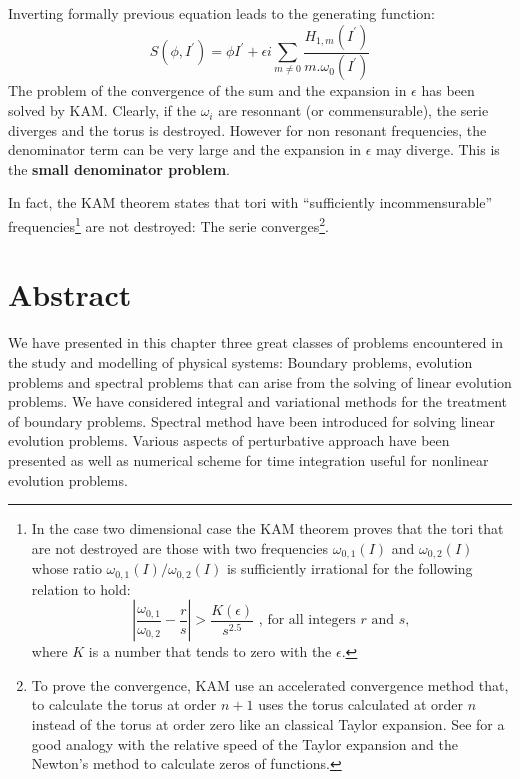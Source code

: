 \documentclass[12pt]{book}
\begin{document}
Inverting formally previous equation leads to the generating function:
\begin{equation}
S(\phi,I^\prime)=\phi I^\prime+\epsilon i \sum_{m\neq
0}\frac{H_{1,m}(I^\prime)}{m.\omega_0(I^\prime)} 
\end{equation}
The problem of the convergence of the sum and the expansion in
$\epsilon$ has been solved by KAM.
Clearly, if the $\omega_i$ are resonnant (or commensurable), the serie
diverges and the torus is destroyed. 
However for non resonant frequencies, the denominator term can be very
large and the expansion in $\epsilon$ may diverge.
This is the {\bf small denominator
problem}. 

In fact, the KAM theorem states that tori with ``sufficiently
incommensurable'' frequencies\footnote{%
In the case two dimensional
case  the KAM
theorem proves that the tori that are not destroyed are those with two
frequencies $\omega_{0,1}(I)$ 
and  $\omega_{0,2}(I)$ whose ratio $\omega_{0,1}(I)/\omega_{0,2}(I)$
is sufficiently irrational for the following relation to hold:
\begin{equation}
\left|\frac{\omega_{0,1}}{\omega_{0,2}}-\frac{r}{s}\right|>
\frac{K(\epsilon)}{s^{2.5}}\mbox{ , for all integers } r\mbox{ and } s,
\end{equation}
where $K$ is a number that tends to zero with the $\epsilon$.

} 
are not destroyed: The serie converges\footnote{%
To prove the convergence, KAM use an accelerated convergence method
that, to calculate the torus at
order $n+1$  uses the torus calculated at order $n$ instead of the
torus at order zero like an classical Taylor expansion. See
\cite{ma:equad:Berry78} for a good analogy with the relative speed of the Taylor
expansion and the Newton's method to calculate zeros of functions.
}.%



\section{Abstract}
We have presented in this chapter three great classes of problems encountered
in the study and modelling of physical systems:
Boundary problems, evolution problems and spectral problems that can arise
from the solving of linear evolution problems.
We have considered integral and variational methods for the treatment of
boundary problems. Spectral method have been introduced for solving linear
evolution problems. 
Various aspects of perturbative approach have been presented as well as
numerical scheme for time integration useful for nonlinear evolution
problems. 
\end{document}

